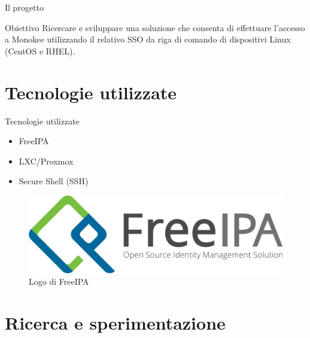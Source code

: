 \documentclass{beamer}
\begin{document}
	\begin{frame}{Il progetto}
		\begin{block}{Obiettivo}
			Ricercare e sviluppare una soluzione che consenta di effettuare l'accesso a Monokee utilizzando il relativo SSO da riga di comando di dispositivi Linux (CentOS e RHEL).
		\end{block}
	\end{frame}

	\section{Tecnologie utilizzate}
	
	\begin{frame}{Tecnologie utilizzate}
				
		\begin{itemize}
			\item FreeIPA \vspace{.5em}
			\item LXC/Proxmox \vspace{.5em}
			\item Secure Shell (SSH) \vspace{.5em}
		\end{itemize}
		
		\begin{figure}[H] 
			\centering 
			\includegraphics[width=0.4\columnwidth]{immagini/logo-freeipa.png} 
			\caption{Logo di FreeIPA}
			\label{fig:freeipa}
		\end{figure}
	\end{frame}
	
	\section{Ricerca e sperimentazione}
	
\end{document}
